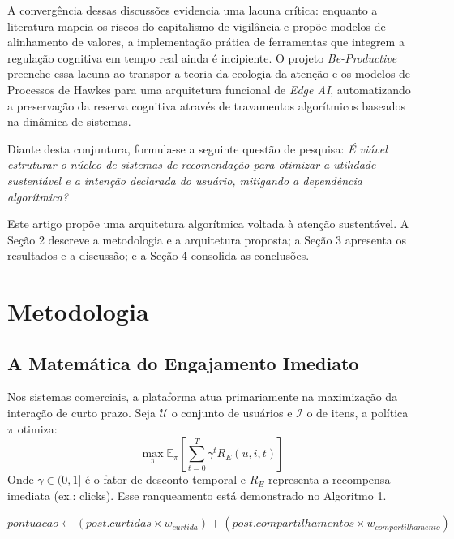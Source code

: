 \documentclass{sbc2023}
\begin{document}
A convergência dessas discussões evidencia uma lacuna crítica: enquanto a literatura mapeia os riscos do capitalismo de vigilância e propõe modelos de alinhamento de valores, a implementação prática de ferramentas que integrem a regulação cognitiva em tempo real ainda é incipiente. O projeto \textit{Be-Productive} preenche essa lacuna ao transpor a teoria da ecologia da atenção \citep{citton2017} e os modelos de Processos de Hawkes \citep{rizoiu2017} para uma arquitetura funcional de \textit{Edge AI}, automatizando a preservação da reserva cognitiva através de travamentos algorítmicos baseados na dinâmica de sistemas.

Diante desta conjuntura, formula-se a seguinte questão de pesquisa: \textit{É viável estruturar o núcleo de sistemas de recomendação para otimizar a utilidade sustentável e a intenção declarada do usuário, mitigando a dependência algorítmica?}

Este artigo propõe uma arquitetura algorítmica voltada à atenção sustentável. A Seção 2 descreve a metodologia e a arquitetura proposta; a Seção 3 apresenta os resultados e a discussão; e a Seção 4 consolida as conclusões.

\section{Metodologia}
\subsection{A Matemática do Engajamento Imediato}
Nos sistemas comerciais, a plataforma atua primariamente na maximização da interação de curto prazo. Seja $\mathcal{U}$ o conjunto de usuários e $\mathcal{I}$ o de itens, a política $\pi$ otimiza:
\begin{equation} \label{eq:engajamento}
\max_{\pi} \mathbb{E}_{\pi} \left[ \sum_{t=0}^{T} \gamma^t R_E(u, i, t) \right]
\end{equation}
Onde $\gamma \in (0, 1]$ é o fator de desconto temporal e $R_E$ representa a recompensa imediata (ex.: clicks). Esse ranqueamento está demonstrado no Algoritmo 1.

\begin{algorithm}[h]
\caption{Lógica Tradicional de Ranqueamento de Feed}
$pontuacao \gets (post.curtidas \times w_{curtida}) + (post.compartilhamentos \times w_{compartilhamento})$\;
\;
\end{algorithm}
\end{document}
